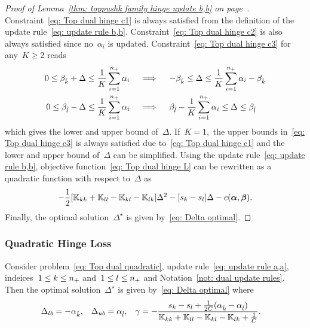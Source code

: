 \toprulebb*
\begin{proof}[Proof of Lemma~\ref{thm: toppushk family hinge update b,b} on page~\pageref{thm: toppushk family hinge update b,b}]
  Constraint~\eqref{eq: Top dual hinge c1} is always satisfied from the definition of the update rule~\eqref{eq: update rule b,b}. Constraint~\eqref{eq: Top dual hinge c2} is also always satisfied since no~$\alpha_i$ is updated. Constraint~\eqref{eq: Top dual hinge c3} for any~$K \geq 2$ reads
  \begin{align*}
    0 \leq \beta_{\hat{k}} + \Delta \leq \frac{1}{K} \sum_{i = 1}^{n_{+}} \alpha_i 
    & \quad \implies \quad
    -\beta_{\hat{k}} \leq \Delta \leq \frac{1}{K} \sum_{i = 1}^{n_{+}} \alpha_i - \beta_{\hat{k}} \\
    0 \leq \beta_{\hat{l}} - \Delta \leq \frac{1}{K} \sum_{i = 1}^{n_{+}} \alpha_i
    & \quad \implies \quad
    \beta_{\hat{l}} - \frac{1}{K} \sum_{i = 1}^{n_{+}} \alpha_i \leq \Delta \leq \beta_{\hat{l}}
  \end{align*}
  which gives the lower and upper bound of~$\Delta.$ If~$K = 1,$ the upper bounds in~\eqref{eq: Top dual hinge c3} is always satisfied due to~\eqref{eq: Top dual hinge c1} and the lower and upper bound of~$\Delta$ can be simplified. Using the update rule~\eqref{eq: update rule b,b}, objective function~\eqref{eq: Top dual hinge L} can be rewritten as a quadratic function with respect to~$\Delta$ as
  \begin{equation*}
    - \frac{1}{2} \Brac[s]{\K_{kk} + \K_{ll} - \K_{kl} - \K_{lk}} \Delta^2
    - \Brac[s]{s_k - s_l} \Delta
    - c(\bm{\alpha}, \bm{\beta}).
  \end{equation*}
  Finally, the optimal solution~$\Delta^{\star}$ is given by~\eqref{eq: Delta optimal}.
\end{proof}

\subsubsection{Quadratic Hinge Loss}

\begin{lemma}\label{thm: toppushk family quadratic update a,a}
  Consider problem~\eqref{eq: Top dual quadratic}, update rule~\eqref{eq: update rule a,a}, indeices~$1 \leq k \leq n_{+}$ and~$1 \leq l \leq n_{+}$ and Notation~\ref{not: dual update rules}. Then the optimal solution~$\Delta^{\star}$ is given by~\eqref{eq: Delta optimal} where
  \begin{align*}
    \Delta_{lb} & = -\alpha_{\hat{k}}, &
    \Delta_{ub} & = \alpha_{\hat{l}}, &
    \gamma & = -\frac{s_k - s_l + \frac{1}{2C}(\alpha_{\hat{k}} - \alpha_{\hat{l}})}{\mathbb{K}_{kk} + \mathbb{K}_{ll} - \mathbb{K}_{kl} - \mathbb{K}_{lk} + \frac{1}{C}}.
  \end{align*}
\end{lemma}

